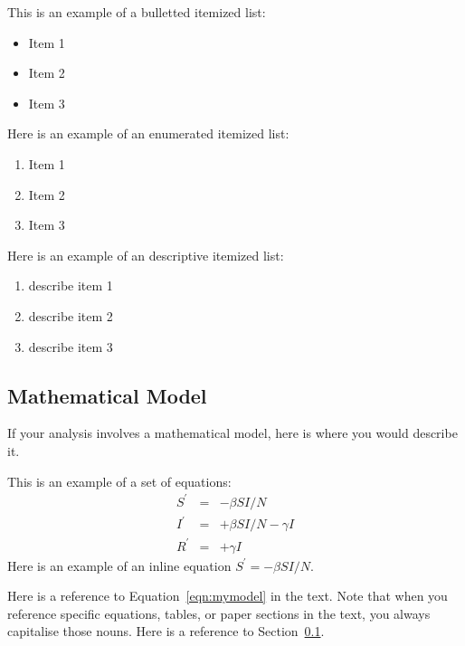 \documentclass[12pt]{article}
\begin{document}
This is an example of a bulletted itemized list:
\begin{itemize}
\item Item 1
\item Item 2
\item Item 3
\end{itemize}

Here is an example of an enumerated itemized list:
\begin{enumerate}
\item Item 1
\item Item 2
\item Item 3
\end{enumerate}

Here is an example of an descriptive itemized list:
\begin{enumerate}
\item[Item 1:] describe item 1
\item[Item 2:] describe item 2
\item[Item 3:] describe item 3
\end{enumerate}


\subsection{Mathematical Model}
\label{sec:math_model}

If your analysis involves a mathematical model, here is where you would describe it.

This is an example of a set of equations:
\begin{eqnarray}
S^\prime & = & -\beta S I/N \nonumber \\
I^\prime & = & +\beta S I/N -\gamma I\nonumber \\
R^\prime & = & +\gamma I
\label{eqn:mymodel}
\end{eqnarray}
Here is an example of an inline equation $S^\prime = -\beta S I/N$.

Here is a reference to Equation~\ref{eqn:mymodel} in the text.  Note that when you
reference specific equations, tables, or paper sections in the text, you always 
capitalise those nouns.  Here is a reference to Section~\ref{sec:math_model}.


\end{document}
